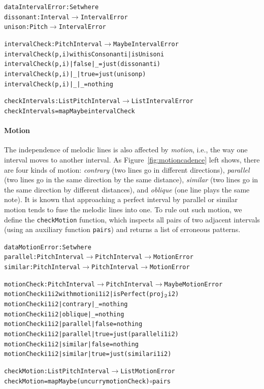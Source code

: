 \begin{alltt}
data IntervalError : Set where
  dissonant : Interval \(\rightarrow\) IntervalError
  unison    : Pitch    \(\rightarrow\) IntervalError

intervalCheck : PitchInterval \(\rightarrow\) Maybe IntervalError
intervalCheck (p , i) with isConsonant i | isUnison i
intervalCheck (p , i) | false | _    = just (dissonant i)
intervalCheck (p , i) | _     | true = just (unison p)
intervalCheck (p , i) | _     | _    = nothing

checkIntervals : List PitchInterval \(\rightarrow\) List IntervalError
checkIntervals = mapMaybe intervalCheck
\end{alltt}

\paragraph{Motion}

\MotionCadence

The independence of melodic lines is also affected by \emph{motion},
i.e., the way one interval moves to another interval.
As Figure~\ref{fig:motioncadence} left shows, there are four kinds of motion:
\emph{contrary} (two lines go in different directions),
\emph{parallel} (two lines go in the same direction by the same
distance), \emph{similar} (two lines go in the same direction by
different distances), and \emph{oblique} (one line plays the same note).
It is known that approaching a perfect interval by parallel or similar
motion tends to fuse the melodic lines into one.
To rule out such motion, we define the \texttt{checkMotion}
function, which inspects all pairs of two adjacent intervals (using an
auxiliary function \texttt{pairs}) and returns a list of erroneous patterns.

\begin{alltt}
data MotionError : Set where
  parallel : PitchInterval \(\rightarrow\) PitchInterval \(\rightarrow\) MotionError
  similar  : PitchInterval \(\rightarrow\) PitchInterval \(\rightarrow\) MotionError

motionCheck : PitchInterval \(\rightarrow\) PitchInterval \(\rightarrow\) Maybe MotionError
motionCheck i1 i2 with motion i1 i2 | isPerfect (proj\(\sb{2}\) i2)
motionCheck i1 i2 | contrary | \_     = nothing
motionCheck i1 i2 | oblique  | \_     = nothing
motionCheck i1 i2 | parallel | false = nothing
motionCheck i1 i2 | parallel | true  = just (parallel i1 i2)
motionCheck i1 i2 | similar  | false = nothing
motionCheck i1 i2 | similar  | true  = just (similar i1 i2)

checkMotion : List PitchInterval \(\rightarrow\) List MotionError
checkMotion = mapMaybe (uncurry motionCheck) \(\circ\) pairs
\end{alltt}

